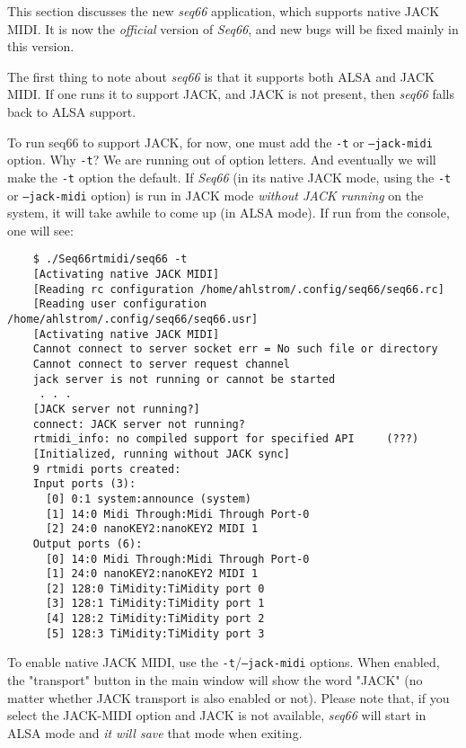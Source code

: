   This section discusses the new \textsl{seq66} application, which supports
   native JACK MIDI.  It is now the \textsl{official} version of
   \textsl{Seq66}, and new bugs will be fixed mainly in this version.

   The first thing to note about \textsl{seq66}
   is that it supports both ALSA and JACK
   MIDI.  If one runs it to support JACK, and JACK is not present, then
   \textsl{seq66}
   falls back to ALSA support.

   To run seq66 to support JACK, for now, one must add the
   \texttt{-t} or \texttt{--jack-midi}
   option.  Why \texttt{-t}?  We are running out of option letters.
   And eventually we will make the \texttt{-t} option the default.
   If \textsl{Seq66} (in its native JACK mode, using the
   \texttt{-t} or \texttt{--jack-midi} option)
   is run in JACK mode \textsl{without JACK running} on
   the system, it will take awhile to come up (in ALSA mode).  If run from the
   console, one will see:

\begin{verbatim}
	$ ./Seq66rtmidi/seq66 -t
	[Activating native JACK MIDI]
	[Reading rc configuration /home/ahlstrom/.config/seq66/seq66.rc]
	[Reading user configuration /home/ahlstrom/.config/seq66/seq66.usr]
	[Activating native JACK MIDI]
	Cannot connect to server socket err = No such file or directory
	Cannot connect to server request channel
	jack server is not running or cannot be started
     . . .
	[JACK server not running?]
	connect: JACK server not running?
	rtmidi_info: no compiled support for specified API     (???)
	[Initialized, running without JACK sync]
	9 rtmidi ports created:
	Input ports (3):
	  [0] 0:1 system:announce (system)
	  [1] 14:0 Midi Through:Midi Through Port-0
	  [2] 24:0 nanoKEY2:nanoKEY2 MIDI 1
	Output ports (6):
	  [0] 14:0 Midi Through:Midi Through Port-0 
	  [1] 24:0 nanoKEY2:nanoKEY2 MIDI 1 
	  [2] 128:0 TiMidity:TiMidity port 0 
	  [3] 128:1 TiMidity:TiMidity port 1 
	  [4] 128:2 TiMidity:TiMidity port 2 
	  [5] 128:3 TiMidity:TiMidity port 3 
\end{verbatim}

   To enable native JACK MIDI, use the
   \texttt{-t}/\texttt{--jack-midi} options.
   When enabled, the "transport" button in the main window will show the word
   "JACK" (no matter whether JACK transport is also enabled or not).
   Please note that, if you
   select the JACK-MIDI option and JACK is not available,
   \textsl{seq66} will start in
   ALSA mode and \textsl{it will save} that mode when exiting.

